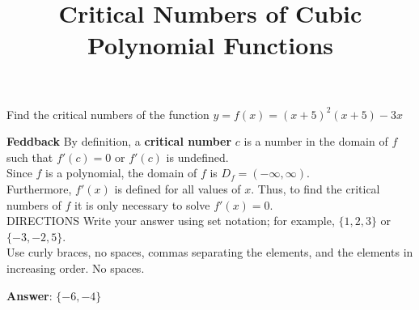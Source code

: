 \documentclass{ximera}
\title{Critical Numbers of Cubic Polynomial Functions}
\begin{document}

 Find the critical numbers of the function  \(\displaystyle   y = f(x) = (x+5)^2\left(x+5\right)-3x\)
	  
\textbf{Feddback} 	By definition, a \textbf{critical number} \(c\) is a number in the domain of \(f\) such that \(f'(c)=0\) or     \(f'(c)\) is undefined.  
\\Since \(f\) is a polynomial, the domain of \(f\) is \( D_f = (-\infty, \infty)\).   
\\Furthermore, \(f'(x)\) is defined for all values of \(x\). Thus, to find the critical numbers of \(f\) it is only necessary to solve \(f'(x)=0\). 	  \\DIRECTIONS   	Write your answer using set notation; for example, \(\{1,2,3\}\) or \(\{-3,-2,5\}\).  
\\ Use curly braces, no spaces, commas separating the elements, and the elements in increasing order. No spaces.

\textbf{Answer}:  	\(\{-6,-4\}\)
\end{document}
